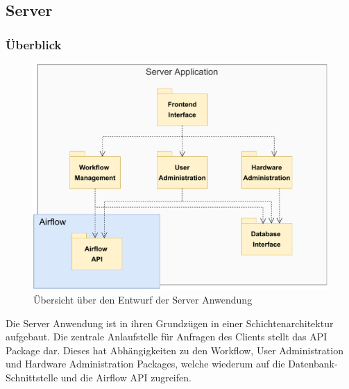\subsection{Server}

\subsubsection{Überblick}
\begin{figure}[H]
    \includegraphics[width=1\textwidth]{res/Moduluebersicht.pdf}
    \caption{Übersicht über den Entwurf der Server Anwendung}
\end{figure}
Die Server Anwendung ist in ihren Grundzügen in einer Schichtenarchitektur aufgebaut. 
Die zentrale Anlaufstelle für Anfragen des Clients stellt das API Package dar.
Dieses hat Abhängigkeiten zu den Workflow, User Administration und Hardware Administration Packages, welche wiederum auf die Datenbank-Schnittstelle und die Airflow API zugreifen.



